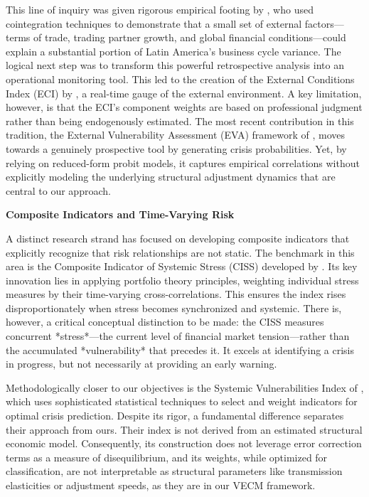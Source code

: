 \documentclass[12pt,a4paper]{article}
\numberwithin{equation}{section}
\theoremstyle{definition}
\theoremstyle{remark}
\begin{document}
This line of inquiry was given rigorous empirical footing by \textcite{izquierdo2008booms}, who used cointegration techniques to demonstrate that a small set of external factors—terms of trade, trading partner growth, and global financial conditions—could explain a substantial portion of Latin America's business cycle variance. The logical next step was to transform this powerful retrospective analysis into an operational monitoring tool. This led to the creation of the External Conditions Index (ECI) by \textcite{talvi2013latin}, a real-time gauge of the external environment. A key limitation, however, is that the ECI's component weights are based on professional judgment rather than being endogenously estimated. The most recent contribution in this tradition, the External Vulnerability Assessment (EVA) framework of \textcite{cavallo2023external}, moves towards a genuinely prospective tool by generating crisis probabilities. Yet, by relying on reduced-form probit models, it captures empirical correlations without explicitly modeling the underlying structural adjustment dynamics that are central to our approach.

\textbf{Composite Indicators and Time-Varying Risk}

A distinct research strand has focused on developing composite indicators that explicitly recognize that risk relationships are not static. The benchmark in this area is the Composite Indicator of Systemic Stress (CISS) developed by \textcite{hollo2012ciss}. Its key innovation lies in applying portfolio theory principles, weighting individual stress measures by their time-varying cross-correlations. This ensures the index rises disproportionately when stress becomes synchronized and systemic. There is, however, a critical conceptual distinction to be made: the CISS measures concurrent *stress*—the current level of financial market tension—rather than the accumulated *vulnerability* that precedes it. It excels at identifying a crisis in progress, but not necessarily at providing an early warning.

Methodologically closer to our objectives is the Systemic Vulnerabilities Index of \textcite{ayvazyan2025financial}, which uses sophisticated statistical techniques to select and weight indicators for optimal crisis prediction. Despite its rigor, a fundamental difference separates their approach from ours. Their index is not derived from an estimated structural economic model. Consequently, its construction does not leverage error correction terms as a measure of disequilibrium, and its weights, while optimized for classification, are not interpretable as structural parameters like transmission elasticities or adjustment speeds, as they are in our VECM framework.
\end{document}
